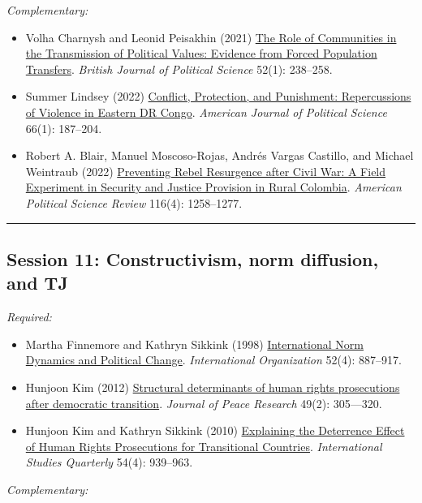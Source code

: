 \documentclass[12pt, a4paper]{article}
\begin{document}
\noindent\textit{Complementary:}

\begin{itemize}
	\item Volha Charnysh and Leonid Peisakhin (2021) \href{https://doi.org/10.1017/S0007123420000447}{The Role of Communities in the Transmission of Political Values: Evidence from Forced Population Transfers}. \textit{British Journal of Political Science} 52(1): 238--258.
  \item Summer Lindsey (2022) \href{https://doi.org/10.1111/ajps.12637}{Conflict, Protection, and Punishment: Repercussions of Violence in Eastern DR Congo}. \textit{American Journal of Political Science} 66(1): 187--204.
	\item Robert A. Blair, Manuel Moscoso-Rojas, Andrés Vargas Castillo, and Michael Weintraub (2022) \href{https://doi.org/10.1017/S0003055422000284}{Preventing Rebel Resurgence after Civil War: A Field Experiment in Security and Justice Provision in Rural Colombia}. \textit{American Political Science Review} 116(4): 1258--1277.
\end{itemize}

\vspace{20pt}
\hrule
\subsection*{Session 11: Constructivism, norm diffusion, and TJ}

\noindent\textit{Required:}

\begin{itemize}
	\item Martha Finnemore and Kathryn Sikkink (1998) \href{https://doi.org/10.1162/002081898550789}{International Norm Dynamics and Political Change}. \textit{International Organization} 52(4): 887--917.
  \item Hunjoon Kim (2012) \href{https://doi.org/10.1177/0022343311431600}{Structural determinants of human rights prosecutions after democratic transition}. \textit{Journal of Peace Research} 49(2): 305---320.
	\item Hunjoon Kim and Kathryn Sikkink (2010) \href{https://doi.org/10.1111/j.1468-2478.2010.00621.x}{Explaining the Deterrence Effect of Human Rights Prosecutions for Transitional Countries}. \textit{International Studies Quarterly} 54(4): 939--963.
\end{itemize}

\clearpage
\noindent\textit{Complementary:}
\end{document}
